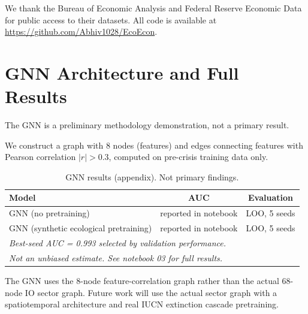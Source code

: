 \documentclass[12pt,a4paper]{article}
\begin{document}
We thank the Bureau of Economic Analysis and Federal Reserve Economic Data for public
access to their datasets. All code is available at
\url{https://github.com/Abhiv1028/EcoEcon}.

\appendix
\section{GNN Architecture and Full Results}
\label{app:gnn}

The GNN is a preliminary methodology demonstration, not a primary result.

We construct a graph with 8 nodes (features) and edges connecting features with
Pearson correlation $|r| > 0.3$, computed on pre-crisis training data only.

\begin{table}[H]
\centering
\caption{GNN results (appendix). Not primary findings.}
\label{tab:gnn}
\begin{tabular}{lcc}
\toprule
\textbf{Model} & \textbf{AUC} & \textbf{Evaluation} \\
\midrule
GNN (no pretraining) & reported in notebook & LOO, 5 seeds \\
GNN (synthetic ecological pretraining) & reported in notebook & LOO, 5 seeds \\
\midrule
\multicolumn{3}{l}{\textit{Best-seed AUC = 0.993 selected by validation performance.}} \\
\multicolumn{3}{l}{\textit{Not an unbiased estimate. See notebook 03 for full results.}} \\
\bottomrule
\end{tabular}
\end{table}

The GNN uses the 8-node feature-correlation graph rather than the actual 68-node IO
sector graph. Future work will use the actual sector graph with a spatiotemporal
architecture and real IUCN extinction cascade pretraining.
\end{document}
